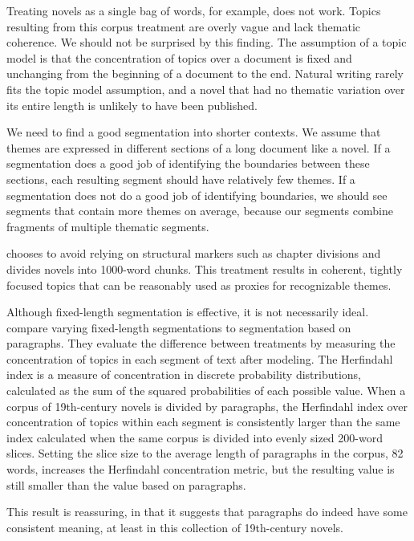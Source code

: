 Treating novels as a single bag of words, for example, does not work.
Topics resulting from this corpus treatment are overly vague and lack thematic coherence.
We should not be surprised by this finding.
The assumption of a topic model is that the concentration of topics over a document is fixed and unchanging from the beginning of a document to the end.
Natural writing rarely fits the topic model assumption, and a novel that had no thematic variation over its entire length is unlikely to have been published.

We need to find a good segmentation into shorter contexts.
We assume that themes are expressed in different sections of a long document like a novel.
If a segmentation does a good job of identifying the boundaries between these sections, each resulting segment should have relatively few themes.
If a segmentation does not do a good job of identifying boundaries, we should see segments that contain more themes on average, because our segments combine fragments of multiple thematic segments.

 \cite{jockers-13} chooses to avoid relying on structural markers such as chapter divisions and divides novels into 1000-word chunks. 
This treatment results in coherent, tightly focused topics that can be reasonably used as proxies for recognizable themes.

Although fixed-length segmentation is effective, it is not necessarily ideal.
\cite{algeehewitt2015paragraphs} compare varying fixed-length segmentations to segmentation based on paragraphs.
They evaluate the difference between treatments by measuring the concentration of topics in each segment of text after modeling.
The Herfindahl index is a measure of concentration in discrete probability distributions, calculated as the sum of the squared probabilities of each possible value.
When a corpus of 19th-century novels is divided by paragraphs, the Herfindahl index over concentration of topics within each segment is consistently larger than the same index calculated when the same corpus is divided into evenly sized 200-word slices.
Setting the slice size to the average length of paragraphs in the corpus, 82 words, increases the Herfindahl concentration metric, but the resulting value is still smaller than the value based on paragraphs.

This result is reassuring, in that it suggests that paragraphs do indeed have some consistent meaning, at least in this collection of 19th-century novels.



